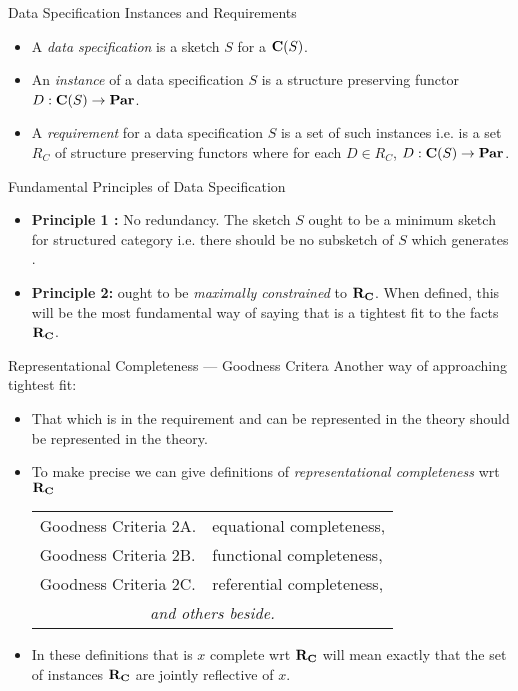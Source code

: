 

\begin{frame}{Data Specification Instances and Requirements}
\begin{itemize}
\item A \textit{data specification} is a sketch $S$ for a \datacatw $\textbf{C}(S)$.
\item An \textit{instance} of a data specification $S$ is a structure preserving functor $D: \textbf{C}(S) \rightarrow \textbf{Par}$.
\item A \textit{requirement} for a data specification $S$ 
is a set of such instances i.e.  is a set $R_C$ of structure preserving functors where for each
$D \in R_C$, $D: \textbf{C}(S) \rightarrow \textbf{Par}$.
\end{itemize}
\end{frame}

\begin{frame}{Fundamental Principles of Data Specification}
\IfSforGammaCwithRCwordsvariant 
\begin{itemize}
\item 
\textbf {Principle 1 :} No redundancy. The sketch $S$ ought to be a minimum sketch for structured category \catcw i.e. there should be no subsketch of $S$ which generates  \catc.
\item
\textbf {Principle 2:} \catcw ought to be \textit{maximally constrained} to $\textbf{R}_{\textbf{C}}$.
When defined, this will be the most fundamental way of saying that \catcw is a tightest fit to the facts $\textbf{R}_{\textbf{C}}$.
\end{itemize}
\end{frame}


\begin{frame}{Representational Completeness --- Goodness Critera}
Another way of approaching tightest fit:
\begin{itemize}
\item That which is in the requirement and can be represented in the theory should be represented in the theory.
\pause \item To make precise we can give definitions
 of \textit{representational completeness} wrt $\textbf{R}_{\textbf{C}}$ 
\begin{center}
\begin{tabular}{l l} 
Goodness Criteria 2A. & equational completeness,   \\
Goodness Criteria 2B. & functional completeness,   \\
Goodness Criteria 2C. & referential completeness,  \\
\multicolumn{2}{c}{\textit{and others beside.}}      \\
\end{tabular}
\end{center}
\pause \item In these definitions that \catcw is $x$ complete wrt $\textbf{R}_{\textbf{C}}$ will mean exactly that the set of instances $\textbf{R}_{\textbf{C}}$ are jointly reflective of $x$.
\end{itemize}
\end{frame}

